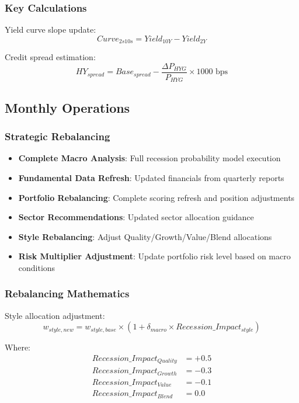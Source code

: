 \documentclass[12pt,a4paper]{article}
\begin{document}
\subsubsection{Key Calculations}
Yield curve slope update:
\begin{equation}
Curve_{2s10s} = Yield_{10Y} - Yield_{2Y}
\end{equation}

Credit spread estimation:
\begin{equation}
HY_{spread} = Base_{spread} - \frac{\Delta P_{HYG}}{P_{HYG}} \times 1000 \text{ bps}
\end{equation}

\subsection{Monthly Operations}

\subsubsection{Strategic Rebalancing}
\begin{itemize}
    \item \textbf{Complete Macro Analysis}: Full recession probability model execution
    \item \textbf{Fundamental Data Refresh}: Updated financials from quarterly reports
    \item \textbf{Portfolio Rebalancing}: Complete scoring refresh and position adjustments
    \item \textbf{Sector Recommendations}: Updated sector allocation guidance
    \item \textbf{Style Rebalancing}: Adjust Quality/Growth/Value/Blend allocations
    \item \textbf{Risk Multiplier Adjustment}: Update portfolio risk level based on macro conditions
\end{itemize}

\subsubsection{Rebalancing Mathematics}
Style allocation adjustment:
\begin{equation}
w_{style,new} = w_{style,base} \times \left(1 + \delta_{macro} \times Recession\_Impact_{style}\right)
\end{equation}

Where:
\begin{align}
Recession\_Impact_{Quality} &= +0.5 \\
Recession\_Impact_{Growth} &= -0.3 \\
Recession\_Impact_{Value} &= -0.1 \\
Recession\_Impact_{Blend} &= 0.0
\end{align}
\end{document}
